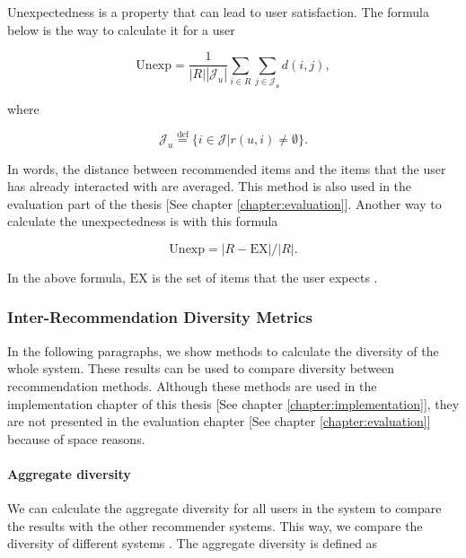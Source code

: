 Unexpectedness is a property that can lead to user satisfaction. The formula below is the way to calculate it for a user

\begin{equation}
\mathrm {Unexp} = \frac { 1 } { | R | \left| \mathcal { J } _ { u } \right| } \sum _ { i \in R } \sum _ { j \in \mathcal { J } _ { u } } d ( i , j ) ,
\label{eq:unexp}
\end{equation}


where 

\begin{equation}
\mathcal { J } _ { u } \stackrel { \mathrm { def } } { = } \{ i \in \mathcal { J } | r ( u , i ) \neq \emptyset \} .
\label{eq:unexp-set}
\end{equation}

In words, the distance between recommended items and the items that the user has already interacted with are averaged. This method is also used in the evaluation part of the thesis [See chapter \ref{chapter:evaluation}]. Another way to calculate the unexpectedness is with this formula

\begin{equation}
\mathrm {Unexp} = | R - \mathrm {EX} | / | R | .
\label{eq:unexp-2}
\end{equation}

In the above formula, $\mathrm {EX}$ is the set of items that the user expects \cite{castells2015novelty}.

\subsubsection{Inter-Recommendation Diversity Metrics}

In the following paragraphs, we show methods to calculate the diversity of the whole system. These results can be used to compare diversity between recommendation methods. Although these methods are used in the implementation chapter of this thesis [See chapter \ref{chapter:implementation}], they are not presented in the evaluation chapter [See chapter \ref{chapter:evaluation}] because of space reasons.

\paragraph{Aggregate diversity}

We can calculate the aggregate diversity for all users in the system to compare the results with the other recommender systems. This way, we compare the diversity of different systems \cite{castells2015novelty}. The aggregate diversity is defined as


